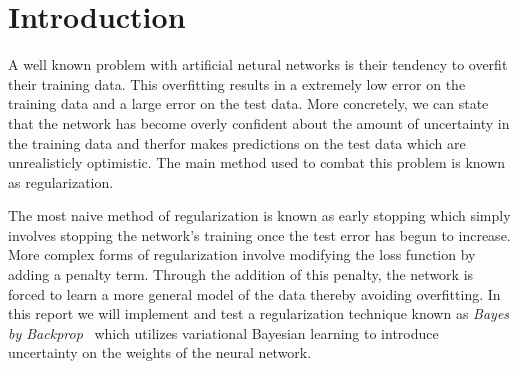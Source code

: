 \documentclass[11pt]{article}
\begin{document}
\setcounter{section}{0}
\thispagestyle{empty}

\noindent{}
\bigskip

\newcommand\Ind{{\mathbb{I}}}
\newcommand\Exp{{\mathbb{E}}}
\newcommand\KL{{\operatorname{KL}}}

\section{Introduction}
A well known problem with artificial netural networks is their tendency to 
overfit their training data. This overfitting results in a extremely low 
error on the training data and a large error on the test data. More concretely,
we can state that the network has become overly confident about the amount of
uncertainty in the training data and therfor makes predictions on the test
data which are unrealisticly optimistic. The main method used to combat 
this problem is known as regularization. 

The most naive method of regularization is known as early stopping which simply
involves stopping the network's training once the test error has begun to
increase. More complex forms of regularization involve modifying the loss 
function by adding a penalty term. Through the addition of this penalty, the
network is forced to learn a more general model of the data thereby avoiding
overfitting. In this report we will implement and test a regularization 
technique known as \textit{Bayes by Backprop}~\cite{blundell} which utilizes 
variational Bayesian learning to introduce uncertainty on the weights of the 
neural network.
\end{document}
